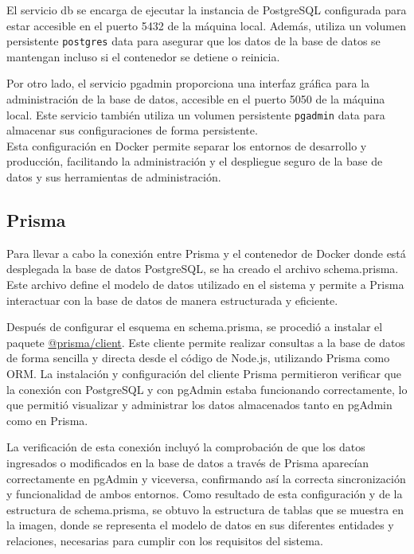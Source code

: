 El servicio db se encarga de ejecutar la instancia de PostgreSQL configurada para estar accesible en el puerto 5432 de la máquina local. Además, utiliza un volumen persistente \texttt{postgres} data para asegurar que los datos de la base de datos se mantengan incluso si el contenedor se detiene o reinicia.

Por otro lado, el servicio pgadmin proporciona una interfaz gráfica para la administración de la base de datos, accesible en el puerto 5050 de la máquina local. Este servicio también utiliza un volumen persistente \texttt{pgadmin} data para almacenar sus configuraciones de forma persistente. \\

Esta configuración en Docker permite separar los entornos de desarrollo y producción, facilitando la administración y el despliegue seguro de la base de datos y sus herramientas de administración.

\subsection{Prisma}
Para llevar a cabo la conexión entre Prisma y el contenedor de Docker donde está desplegada la base de datos PostgreSQL, se ha creado el archivo schema.prisma. Este archivo define el modelo de datos utilizado en el sistema y permite a Prisma interactuar con la base de datos de manera estructurada y eficiente.

Después de configurar el esquema en schema.prisma, se procedió a instalar el paquete \url{@prisma/client}. Este cliente permite realizar consultas a la base de datos de forma sencilla y directa desde el código de Node.js, utilizando Prisma como ORM. La instalación y configuración del cliente Prisma permitieron verificar que la conexión con PostgreSQL y con pgAdmin estaba funcionando correctamente, lo que permitió visualizar y administrar los datos almacenados tanto en pgAdmin como en Prisma.

La verificación de esta conexión incluyó la comprobación de que los datos ingresados o modificados en la base de datos a través de Prisma aparecían correctamente en pgAdmin y viceversa, confirmando así la correcta sincronización y funcionalidad de ambos entornos. Como resultado de esta configuración y de la estructura de schema.prisma, se obtuvo la estructura de tablas que se muestra en la imagen, donde se representa el modelo de datos en sus diferentes entidades y relaciones, necesarias para cumplir con los requisitos del sistema.
\newpage

